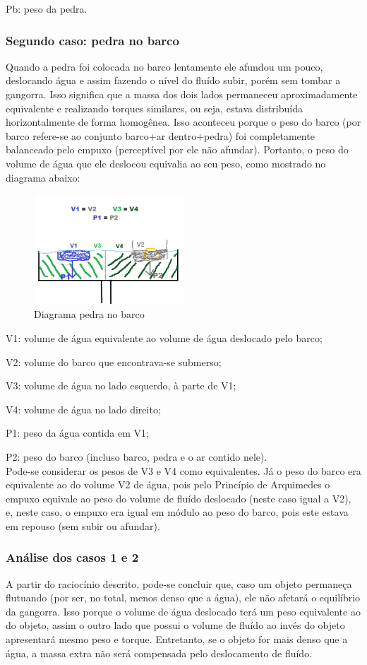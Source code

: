 Pb: peso da pedra.

\subsubsection{Segundo caso: pedra no barco}
Quando a pedra foi colocada no barco lentamente ele afundou um pouco, deslocando água e assim fazendo o nível do fluído subir, porém sem tombar a gangorra. Isso significa que a massa dos dois lados permaneceu aproximadamente equivalente e realizando torques similares, ou seja, estava distribuída horizontalmente de forma homogênea. Isso aconteceu porque o peso do barco (por barco refere-se ao conjunto barco+ar dentro+pedra) foi completamente balanceado pelo empuxo (perceptível por ele não afundar). Portanto, o peso do volume de água que ele deslocou equivalia ao seu peso, como mostrado no diagrama abaixo:
\begin{figure}[H]
    \centering
    \includegraphics[width=0.5\textwidth]{fig/Gangorra2.png}
    \caption{Diagrama pedra no barco}
\end{figure}
V1: volume de água equivalente ao volume de água deslocado pelo barco;

V2: volume do barco que encontrava-se submerso;

V3: volume de água no lado esquerdo, à parte de V1;

V4: volume de água no lado direito;

P1: peso da água contida em V1;

P2: peso do barco (incluso barco, pedra e o ar contido nele).
\\

Pode-se considerar os pesos de V3 e V4 como equivalentes. Já o peso do barco era equivalente ao do volume V2 de água, pois pelo Princípio de Arquimedes o empuxo equivale ao peso do volume de fluído deslocado (neste caso igual a V2), e, neste caso, o empuxo era igual em módulo ao peso do barco, pois este estava em repouso (sem subir ou afundar).

\subsubsection{Análise dos casos 1 e 2}
A partir do raciocínio descrito, pode-se concluir que, caso um objeto permaneça flutuando (por ser, no total, menos denso que a água), ele não afetará o equilíbrio da gangorra. Isso porque o volume de água deslocado terá um peso equivalente ao do objeto, assim o outro lado que possui o volume de fluído ao invés do objeto apresentará mesmo peso e torque. Entretanto, se o objeto for mais denso que a água, a massa extra não será compensada pelo deslocamento de fluído.

